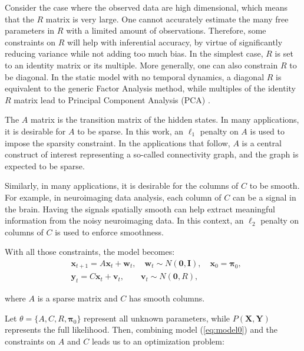 \documentclass[times,twocolumn,final,authoryear]{elsarticle}
\providecommand{\mb}[1]{\boldsymbol{#1}}
\newcommand{\bx}{\mb{x}}
\newcommand{\by}{\mb{y}}
\newcommand{\bX}{\mb{X}}
\newcommand{\bY}{\mb{Y}}
\let\oldref\ref
\renewcommand{\ref}[1]{(\oldref{#1})}
\begin{document}
Consider the case where the observed data are high dimensional, which means that the  $R$ matrix is very large. One cannot accurately estimate the many free parameters in $R$ with a limited amount of observations. Therefore, some constraints on $R$ will help with inferential accuracy, by virtue of significantly reducing variance while not adding too much bias. In the simplest case, $R$ is set to an identity matrix or its multiple. More generally, one can also constrain $R$ to be diagonal. In the static model with no temporal dynamics, a diagonal $R$ is equivalent to the generic Factor Analysis method, while multiples of the identity $R$ matrix lead to Principal Component Analysis (PCA) \citep{roweis1999unifying}.

The $A$ matrix is the transition matrix of the hidden states. In many applications, it is desirable for $A$ to be sparse. In this work, an $\ell_1$ penalty on $A$ is used to impose the sparsity constraint. In the applications that follow, $A$ is a central construct of interest representing a so-called connectivity graph, and the graph is expected to be sparse.

Similarly, in many applications, it is desirable for the columns of $C$ to be smooth. For example, in neuroimaging data analysis, each column of $C$ can be a signal in the brain. Having the signals spatially smooth can help extract meaningful information from the noisy neuroimaging data. In this context, an $\ell_2$ penalty on columns of $C$ is used to enforce smoothness.

With all those constraints, the model becomes:
\begin{equation}\label{eq:model0}
\begin{aligned}
	&\bx_{t+1}=A\bx_{t}+\mathbf{w}_t, \quad \mathbf{w}_t\sim N(\mathbf{0},\mathbf{I}),\quad \bx_0 = \mathbf{\pi}_0,\\
	&\by_t=C\bx_t+\mathbf{v}_t,\qquad \mathbf{v}_t\sim N(\mathbf{0},R),
\end{aligned}
\end{equation}

where $A$ is a sparse matrix and $C$ has smooth columns.

Let $\theta =\{A,C,R,\mathbf{\pi}_0\}$ represent all unknown parameters, while $P(\bX,\bY)$ represents the full likelihood. Then, combining model \ref{eq:model0} and the constraints on $A$ and $C$ leads us to an optimization problem:
\end{document}
